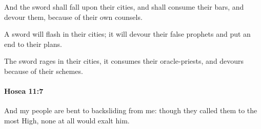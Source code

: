 			\begin{versebox}
					\item[BHS] 
					\item[LXX] 
					\item[ASV] And the sword shall fall upon their cities, and shall consume their bars, and devour them, because of their own counsels.
					\item[NIV] A sword will flash in their cities; it will devour their false prophets and put an end to their plans.
					\item[NRSV] The sword rages in their cities, it consumes their oracle-priests, and devours because of their schemes.
			\end{versebox}

		\paragraph{Hosea 11:7} %
			\label{HOSEA-11-7}

			And my people are bent to backsliding from me: though they called them to the most High, none at all would exalt him.

